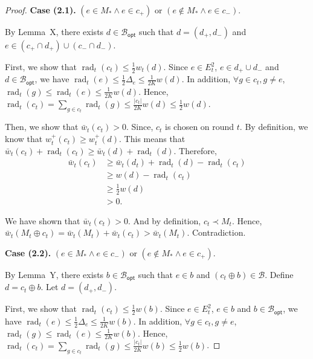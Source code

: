 \documentclass{article}
\newcommand{\diffvalid}{\prec}
\newcommand{\B}{\mathcal B}
\newcommand{\Bopt}{\mathcal B_{\mathsf{opt}}}
\DeclareMathOperator{\rad}{rad}
\begin{document}
\begin{spacing}{1.1}
\begin{proof}
\textbf{Case (2.1).} 
$(e \in M_* \wedge e\in c_+)$ or $(e \not \in M_* \wedge e\in c_-)$. 

By Lemma~X, there exists $d\in \Bopt$ such that $d=(d_+,d_-)$ and $e\in (c_+\cap d_+)\cup(c_-\cap d_-)$.

First, we show that $\rad_t(c_t) \le \frac12 w_t(d)$.
Since $e\in E_t^2$, $e\in d_+\cup d_-$ and $d\in \Bopt$, we have $\rad_t(e) \le \frac{1}{2}\Delta_e \le \frac{1}{2K}w(d)$.
In addition, $\forall g\in c_t, g\not=e$, $\rad_t(g) \le \rad_t(e)\le \frac{1}{2K}w(d)$.
Hence, $\rad_t(c_t) = \sum_{g\in c_t} \rad_t(g) \le \frac{|c_t|}{2K}w(d) \le \frac{1}{2}w(d)$.

Then, we show that $\bar w_t(c_t) > 0$.
Since, $c_t$ is chosen on round $t$. 
By definition, we know that $w^+_t(c_t) \ge w^+_t(d)$.
This means that $\bar w_t(c_t)+\rad_t(c_t) \ge \bar w_t(d)+\rad_t(d)$.
Therefore,
\begin{align}
	\bar w_t(c_t) & \ge \bar w_t(d_t)+\rad_t(d)-\rad_t(c_t)\\
				  & \ge w(d)-\rad_t(c_t)\\
				  & \ge \frac{1}{2} w(d) \\
				  & > 0.
\end{align}

We have shown that $\bar w_t(c_t)>0$. And by definition, $c_t \diffvalid M_t$. Hence, $\bar w_t(M_t\oplus c_t) = \bar w_t(M_t)+\bar w_t(c_t) > \bar w_t(M_t)$. Contradiction.


\textbf{Case (2.2).}
$(e \in M_* \wedge e\in c_-)$ or $(e \not \in M_* \wedge e\in c_+)$.

By Lemma~Y, there exists $b\in \Bopt$ such that $e\in b$ and $(c_t\oplus b) \in \B$. Define $d=c_t\oplus b$. Let $d=(d_+,d_-)$.

First, we show that $\rad_t(c_t) \le \frac{1}{2}w(b)$. Since $e\in E_t^2$, $e\in b$ and $b\in \Bopt$, we have $\rad_t(e) \le \frac{1}{2}\Delta_e \le \frac{1}{2K}w(b)$.
In addition, $\forall g\in c_t, g\not=e$, $\rad_t(g) \le \rad_t(e)\le \frac{1}{2K}w(b)$.
Hence, $\rad_t(c_t) = \sum_{g\in c_t} \rad_t(g) \le \frac{|c_t|}{2K}w(b) \le \frac{1}{2}w(b)$.


\end{proof}
\end{spacing}
\end{document}
